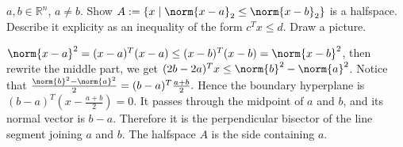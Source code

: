 \documentclass{ctexart}
\begin{document}
\begin{problem}\label{pro:2.7}
  \(a , b \in \mathbb{R}^n \), \(a \neq b \). Show \(A:=\{x \mid \norm{x-a}_2 \leq \norm{x-b}_2\} \) is a halfspace.
  Describe it explicity as an inequality of the form \(c^Tx \leq d \). Draw a picture.
\end{problem}
\begin{solution}
  \(\norm{x-a}^2=(x-a)^T(x-a) \leq (x-b)^T(x-b)=\norm{x-b}^2\), then rewrite the middle part, we get \((2b-2a)^Tx \leq \norm{b}^2 - \norm{a}^2 \).
  Notice that
  \(
    \frac{\norm{b}^2-\norm{a}^2}{2}
    =
    (b-a)^T\frac{a+b}{2}.
  \)
  Hence the boundary hyperplane is
  \(
    (b-a)^T
    \left(
      x-\frac{a+b}{2}
    \right)=0.
  \)
  It passes through the midpoint of \(a\) and \(b\), and its normal
  vector is \(b-a\). Therefore it is the perpendicular bisector of
  the line segment joining \(a\) and \(b\). The halfspace \(A\) is
  the side containing \(a\).
  \begin{center}
  \end{center}
\end{solution}
\end{document}
